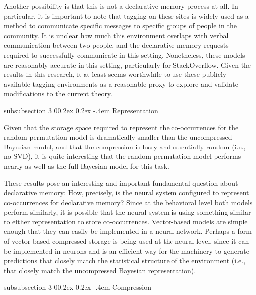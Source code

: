 \documentclass[man,floatsintext,donotrepeattitle]{apa6}
\makeatletter
\renewcommand{\subsubsection}{%
  \@startsection
  {subsubsection}%
  {3}%
  {\parindent}%
  {0\baselineskip \@plus 0.2ex \@minus 0.2ex}%
  {-.4em}%
  {\normalfont\normalsize\bfseries\addperi}}
\makeatother
\begin{document}
Another possibility is that this is not a declarative memory process at all.
In particular, it is important to note that tagging on these sites is widely used as a method to communicate specific messages to specific groups of people in the community.
It is unclear how much this environment overlaps with verbal communication between two people, and the declarative memory requests required to successfully communicate in this setting.
Nonetheless, these models are reasonably accurate in this setting, particularly for StackOverflow.
Given the results in this research, it at least seems worthwhile to use these publicly-available tagging environments as a reasonable proxy to explore and validate modifications to the current theory.

\subsubsection{Representation}

Given that the storage space required to represent the co-occurrences for the random permutation model is dramatically smaller than the uncompressed Bayesian model,
and that the compression is lossy and essentially random (i.e., no SVD),
it is quite interesting that the random permutation model performs nearly as well as the full Bayesian model for this task.

These results pose an interesting and important fundamental question about declarative memory:
How, precisely, is the neural system configured to represent co-occurrences for declarative memory?
Since at the behavioral level both models perform similarly, it is possible that the neural system is using something similar to either representation to store co-occurrences.
Vector-based models are simple enough that they can easily be implemented in a neural network.
Perhaps a form of vector-based compressed storage is being used at the neural level,
since it can be implemented in neurons and is an efficient way for the machinery to generate predictions that closely match the statistical structure of the environment
(i.e., that closely match the uncompressed Bayesian representation).

\subsubsection{Compression}
\end{document}
